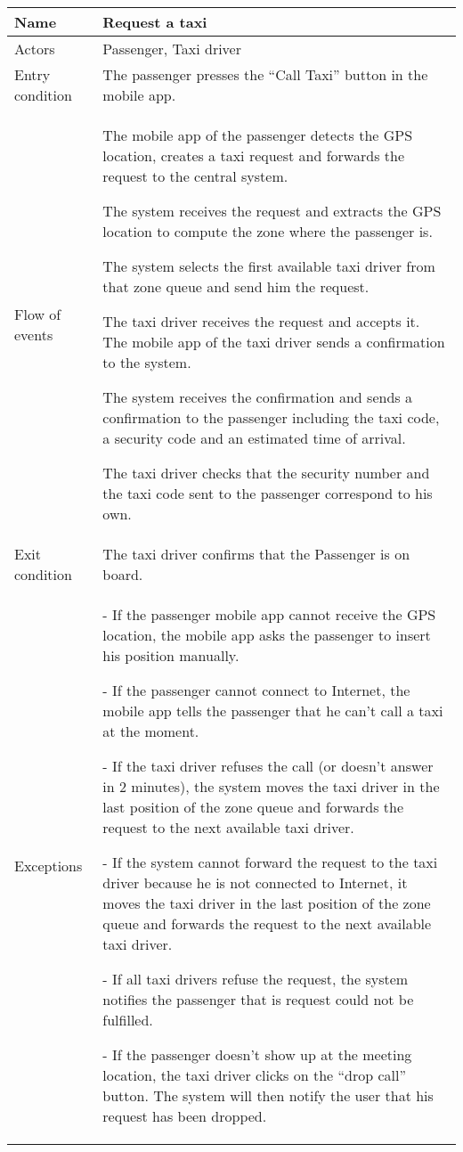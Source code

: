 \begin{center}
\begin{longtable}{|l| p{9cm}|}
\hline
Name &
Request a taxi \\
\hline
Actors &
Passenger, Taxi driver \\
\hline
Entry condition & 
The passenger presses the “Call Taxi” button in the mobile app. \\
\hline
Flow of events &
The mobile app of the passenger detects the GPS location, creates a taxi request and forwards the request to the central system.

The system receives the request and extracts the GPS location to compute the zone where the passenger is.

The system selects the first available taxi driver from that zone queue and send him the request.

The taxi driver receives the request and accepts it. The mobile app of the taxi driver sends a confirmation to the system.

The system receives the confirmation and sends a confirmation to the passenger including the taxi code, a security code and an estimated time of arrival.

The taxi driver checks that the security number and the taxi code sent to the passenger correspond to his own. \\
\hline
Exit condition &
The taxi driver confirms that the Passenger is on board. \\
\hline
Exceptions &
- If the passenger mobile app cannot receive the GPS location, the mobile app asks the passenger to insert his position manually.

- If the passenger cannot connect to Internet, the mobile app tells the passenger that he can't call a taxi at the moment.

- If the taxi driver refuses the call (or doesn't answer in 2 minutes), the system moves the taxi driver in the last position of the zone queue and forwards the request to the next available taxi driver.

- If the system cannot forward the request to the taxi driver because he is not connected to Internet, it moves the taxi driver in the last position of the zone queue and forwards the request to the next available taxi driver.

- If all taxi drivers refuse the request, the system notifies the passenger that is request could not be fulfilled.

- If the passenger doesn't show up at the meeting location, the taxi driver clicks on the “drop call” button. The system will then notify the user that his request has been dropped. \\
\hline
\end{longtable}



\end{center}
